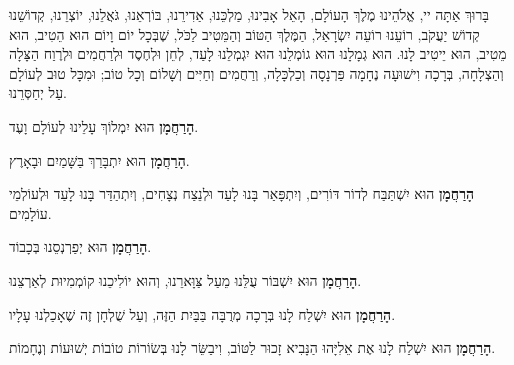 \vspace{1em}

בָּרוּךְ אַתָּה יי, אֱלֹהֵינוּ מֶלֶךְ הָעוֹלָם, הָאֵל אָבִינוּ, מַלְכֵּנוּ, אַדִירֵנוּ, בּוֹרְאֵנוּ, גֹּאֲלֵנוּ, יוֹצְרֵנוּ, קְדוֹשֵׁנוּ קְדוֹשׁ יַעֲקֹב, רוֹעֵנוּ רוֹעֵה יִשְׂרָאַל, הַמֶּלֶךְ הַטּוֹב וְהַמֵּטִיב לַכֹּל, שֶׁבְּכָל יוֹם וָיוֹם הוּא הֵטִיב, הוּא מֵטִיב, הוּא יֵיטִיב לָנוּ. הוּא גְמָלָנוּ הוּא גוֹמְלֵנוּ הוּא יִגְמְלֵנוּ לָעַד, לְחֵן וּלְחֶסֶד וּלְרַחֲמִים וּלְרֶוַח הַצָּלָה וְהַצְלָחָה, בְּרָכָה וִישׁוּעָה נֶחָמָה פַּרְנָסָה וְכַלְכָּלָה, וְרַחֲמִים וְחַיִּים וְשָׁלוֹם וְכָל טוֹב; וּמִכָּל טוּב לְעוֹלָם עַל יְחַסְּרֵנוּ.

\vspace{1em}

\begin{center}

{\large \bf הָרַחֲמָן}
הוּא יִמְלוֹךְ עָלֵינוּ לְעוֹלָם וָעֶד.

{\large \bf הָרַחֲמָן}
הוּא יִתְבָּרַךְ בַּשָּׁמַיִם וּבָאָרֶץ.

{\large \bf הָרַחֲמָן}
הוּא יִשְׁתַּבַּח לְדוֹר דּוֹרִים, וְיִתְפָּאַר בָּנוּ לָעַד וּלְנֵצַח נְצָחִים, וְיִתְהַדַּר בָּנוּ לָעַד וּלְעוֹלְמֵי עוֹלָמִים.

{\large \bf הָרַחֲמָן}
הוּא יְפַרְנְסֵנוּ בְּכָבוֹד.

{\large \bf הָרַחֲמָן}
הוּא יִשְׁבּוֹר עֻלֵּנוּ מֵעַל צַּוָּארֵנוּ, וְהוּא יוֹלִיכֵנוּ קוֹמְמִיוּת לְאַרְצֵנוּ.

{\large \bf הָרַחֲמָן}
הוּא יִשְׁלַח לָנוּ בְּרָכָה מְרֻבָּה בַּבַּיִת הַזֶּה, וְעַל שֻׁלְחָן זֶה שֶׁאָכַלְנוּ עָלָיו.

{\large \bf הָרַחֲמָן}
הוּא יִשְׁלַח לָנוּ אֶת אֵלִיָּהוּ הַנָּבִיא זָכוּר לַטּוֹב, וִיבַשֵּׂר לָנוּ בְּשׂוֹרוֹת טוֹבוֹת יְשׁוּעוֹת וְנֶחָמוֹת.
\end{center}

\vspace{1em}


\vspace{0.5em}

